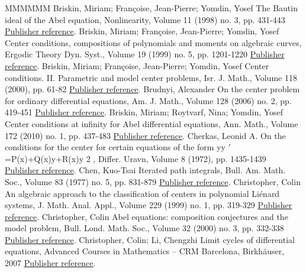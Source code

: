 \documentclass[11pt]{article}
\theoremstyle{definition}
\numberwithin{equation}{section}
\numberwithin{figure}{section}
\numberwithin{table}{section}
\begin{document}
\begin{thebibliography}{MMMMMM}
 Briskin, Miriam; Françoise, Jean-Pierre; Yomdin, Yosef The Bautin ideal of the Abel equation, Nonlinearity, Volume 11 (1998) no. 3, pp. 431-443 \href{https://ahl.centre-mersenne.org/item/AHL_2020__3__615_0/#bfy98}{Publisher reference}.
 Briskin, Miriam; Françoise, Jean-Pierre; Yomdin, Yosef Center conditions, compositions of polynomials and moments on algebraic curves, Ergodic Theory Dyn. Syst., Volume 19 (1999) no. 5, pp. 1201-1220 \href{https://ahl.centre-mersenne.org/item/AHL_2020__3__615_0/#bfy99}{Publisher reference}.
 Briskin, Miriam; Françoise, Jean-Pierre; Yomdin, Yosef Center conditions. II. Parametric and model center problems, Isr. J. Math., Volume 118 (2000), pp. 61-82 \href{https://ahl.centre-mersenne.org/item/AHL_2020__3__615_0/#bfy00}{Publisher reference}.
 Brudnyi, Alexander On the center problem for ordinary differential equations, Am. J. Math., Volume 128 (2006) no. 2, pp. 419-451 \href{https://ahl.centre-mersenne.org/item/AHL_2020__3__615_0/#brud06}{Publisher reference}.
 Briskin, Miriam; Roytvarf, Nina; Yomdin, Yosef Center conditions at infinity for Abel differential equations, Ann. Math., Volume 172 (2010) no. 1, pp. 437-483 \href{https://ahl.centre-mersenne.org/item/AHL_2020__3__615_0/#bry10}{Publisher reference}.
 Cherkas, Leonid A. On the conditions for the center for certain equations of the form yy \(\prime\) =P(x)+Q(x)y+R(x)y 2 , Differ. Uravn, Volume 8 (1972), pp. 1435-1439 \href{https://ahl.centre-mersenne.org/item/AHL_2020__3__615_0/#cher72}{Publisher reference}.
 Chen, Kuo-Tsai Iterated path integrals, Bull. Am. Math. Soc., Volume 83 (1977) no. 5, pp. 831-879 \href{https://ahl.centre-mersenne.org/item/AHL_2020__3__615_0/#chen77}{Publisher reference}.
 Christopher, Colin An algebraic approach to the classification of centers in polynomial Liénard systems, J. Math. Anal. Appl., Volume 229 (1999) no. 1, pp. 319-329 \href{https://ahl.centre-mersenne.org/item/AHL_2020__3__615_0/#chri99}{Publisher reference}.
 Christopher, Colin Abel equations: composition conjectures and the model problem, Bull. Lond. Math. Soc., Volume 32 (2000) no. 3, pp. 332-338 \href{https://ahl.centre-mersenne.org/item/AHL_2020__3__615_0/#chri00}{Publisher reference}.
 Christopher, Colin; Li, Chengzhi Limit cycles of differential equations, Advanced Courses in Mathematics – CRM Barcelona, Birkhäuser, 2007 \href{https://ahl.centre-mersenne.org/item/AHL_2020__3__615_0/#chri07}{Publisher reference}.

\end{thebibliography}
\end{document}
